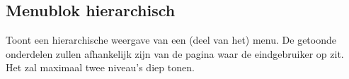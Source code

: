 \subsection{Menublok hierarchisch}
\label{sec:menublokhierarchisch}
Toont een hierarchische weergave van een (deel van het) menu. De getoonde onderdelen zullen afhankelijk zijn van de pagina waar de eindgebruiker op zit. Het zal maximaal twee niveau's diep tonen.
